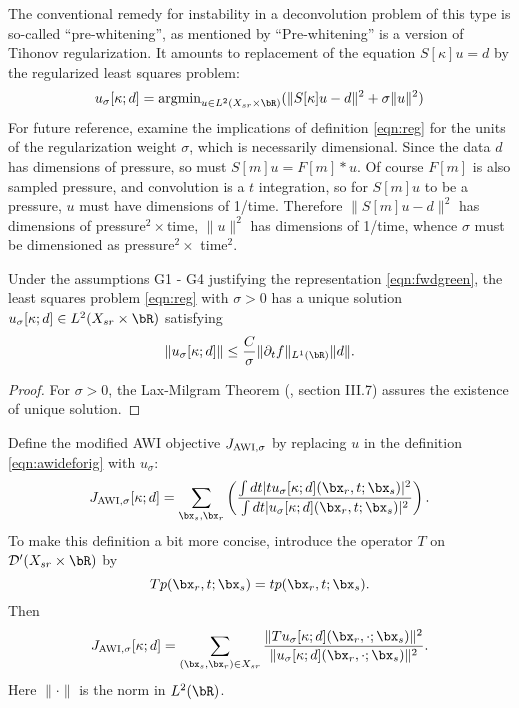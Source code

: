 The conventional remedy for instability in a deconvolution problem of
this type is so-called ``pre-whitening'', as
mentioned by \cite{Warner:16} ``Pre-whitening'' is a version of
Tihonov regularization. It  amounts to replacement of the equation
$S[\kappa]u=d$ by the regularized least squares problem: 
\begin{equation}
  \label{eqn:reg}
  u_{\sigma}[\kappa;d] = \mbox{argmin}_{u \in L^2(X_{sr} \times \bR)} (\|S[\kappa]u-d\|^2 + \sigma\|u\|^2)
\end{equation}
For future reference, examine the
implications of definition \ref{eqn:reg} for the units of the regularization weight $\sigma$,
which  is
necessarily dimensional. Since the data $d$ has dimensions of
pressure, so must $S[m]u = F[m]*u$. Of course $F[m]$ is also sampled
pressure, and convolution is a $t$ integration, so for $S[m]u$ to be a
pressure, $u$ must have dimensions of 1/time. Therefore
$\|S[m]u-d\|^2$ has dimensions of pressure$^2 \times $time, $\|u\|^2$ has
dimensions of 1/time, whence $\sigma$ must be dimensioned as
pressure$^2 \times$  time$^2$.

\begin{prop}
  \label{thm:unorm}
  Under the assumptions G1 - G4 justifying the
  representation \ref{eqn:fwdgreen}, the least squares problem
  \ref{eqn:reg} with $\sigma > 0$ has a unique solution
  $u_{\sigma}[\kappa;d] \in L^2(X_{sr} \times \bR)$ satisfying
  \begin{equation}
    \label{eqn:unorm}
    \|u_{\sigma}[\kappa;d]\| \le \frac{C}{\sigma}\|\partial_t f\|_{L^1(\bR)}\|d\|.
  \end{equation}
\end{prop}
\begin{proof}
For $\sigma > 0$, the Lax-Milgram Theorem (\cite{Yosida}, section
III.7) assures the existence of unique solution. 
\end{proof}

Define the modified
AWI objective $J_{\rm AWI,\sigma}$ by
replacing $u$ in the definition \ref{eqn:awideforig} with $u_{\sigma}$:
\begin{equation}
  \label{eqn:awidef}
  J_{\rm AWI,\sigma}[\kappa;d] = \sum_{\bx_s,\bx_r} \left(\frac{\int dt |tu_{\sigma}[\kappa;d](\bx_r,t;\bx_s)|^2}{\int dt |u_{\sigma}[\kappa;d](\bx_r,t;\bx_s)|^2}\right). 
\end{equation}
To make this definition a bit more concise, introduce the operator $T$ on
${\cal D}'(X_{sr} \times \bR)$ by
\[
  Tp(\bx_r,t;\bx_s) = tp(\bx_r,t;\bx_s).
\]
Then
\begin{equation}
  \label{eqn:awidefbis}
  J_{\rm AWI,\sigma}[\kappa;d] = \sum_{(\bx_s,\bx_r) \in X_{sr}}
  \frac{\|Tu_{\sigma}[\kappa;d](\bx_r,\cdot;\bx_s)\|^2}{\|u_{\sigma}[\kappa;d](\bx_r,\cdot;\bx_s)\|^2}.
\end{equation}
Here $\| \cdot \|$ is the norm in $L^2(\bR)$.

